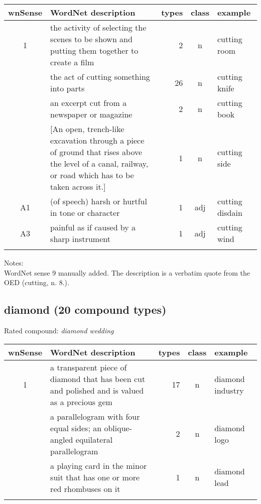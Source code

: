 \begin{longtable}{c>{\raggedright\arraybackslash}p{5cm}rc>{\raggedright\arraybackslash}p{2cm}}\lsptoprule
{\small wnSense}&WordNet description&types&class&example\\\midrule
1&the activity of selecting the scenes to be shown and putting them together to create a film&2&n&cutting room\\\tablevspace
3&the act of cutting something into parts&26&n&cutting knife\\\tablevspace
5&an excerpt cut from a newspaper or magazine&2&n&cutting book\\\tablevspace
9&{}[An open, trench-like excavation through a piece of ground that rises above the level of a canal, railway, or road which has to be taken across it.]&1&n&cutting side\\\tablevspace
A1&(of speech) harsh or hurtful in tone or character&1&adj&cutting disdain\\\tablevspace
A3&painful as if caused by a sharp instrument&1&adj&cutting wind\\\lspbottomrule
\end{longtable}

\noindent
Notes:\\
WordNet sense 9 manually added. The description is a verbatim quote from the OED (cutting, n. 8.).


\pagebreak[4]
\subsection{diamond     (20 compound types)}
Rated compound: \emph{diamond wedding}
\vspace*{1ex}

\noindent

\begin{longtable}{c>{\raggedright\arraybackslash}p{5cm}rc>{\raggedright\arraybackslash}p{2cm}}\lsptoprule
{\small wnSense}&WordNet description&types&class&example\\\midrule
1&a transparent piece of diamond that has been cut and polished and is valued as a precious gem&17&n&diamond industry\\\tablevspace
3&a parallelogram with four equal sides; an oblique-angled equilateral parallelogram&2&n&diamond logo\\\tablevspace
4&a playing card in the minor suit that has one or more red rhombuses on it&1&n&diamond lead\\\lspbottomrule
\end{longtable}

